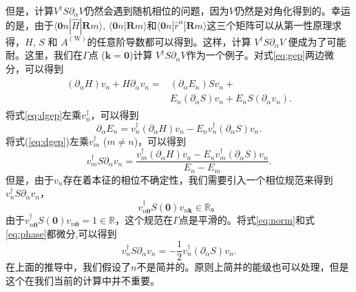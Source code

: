 但是，计算$V^{\dagger}S\partial_{\alpha}V$仍然会遇到随机相位的问题，因为$V$仍然是对角化得到的。幸运的是，由于$\langle\boldsymbol{0}n|\hat{H}|\boldsymbol{R}m\rangle$,
$\langle\boldsymbol{0}n|\boldsymbol{R}m\rangle$和$\langle\boldsymbol{0}n|\hat{r}^{\alpha}|\boldsymbol{R}m\rangle$这三个矩阵可以从第一性原理求得，$H$, $S$ 和 $A^{(\text{W})}$的任意阶导数都可以得到。这样，计算 $V^{\dagger}S\partial_{\alpha}V$ \cite{van2007computation}便成为了可能耐。这里，我们在$\Gamma$点 ($\boldsymbol{k}=\boldsymbol{0}$)计算
$V^{\dagger}S\partial_{\alpha}V$作为一个例子。对式\ref{eq:gep}两边微分，可以得到
\begin{align}
\begin{split}
(\partial_\alpha H)v_n+H\partial_\alpha v_n = & (\partial_\alpha E_n)Sv_n+\\
& E_n(\partial_\alpha S)v_n+E_n S(\partial_\alpha v_n).\label{eq:dgep}
\end{split}
\end{align}
将式\ref{eq:dgep}左乘$v_{n}^{\dagger}$，可以得到
\[
\partial_\alpha E_{n}=v_{n}^{\dagger}(\partial_\alpha H) v_{n}-E_{n}v_{n}^{\dagger}(\partial_\alpha S)v_{n}.
\]
将式(\ref{eq:dgep})左乘$v_{m}^{\dagger}$ ($m\ne n$)，可以得到
\[
v_{m}^{\dagger}S\partial_\alpha v_{n}=\frac{v_{m}^{\dagger}(\partial_\alpha H)v_{n}-E_{n}v_{m}^{\dagger}(\partial_\alpha S)v_{n}}{E_n-E_m}.
\]
但是，由于$v_{n}$存在着本征的相位不确定性，我们需要引入一个相位规范来得到$v_{n}^{\dagger}S \partial_\alpha v_{n}$，
\begin{equation}
v_{n\boldsymbol{0}}^{\dagger}S(\boldsymbol{0})v_{n\boldsymbol{k}}\in\mathbb{R}。\label{eq:phase}
\end{equation}
由于$v_{n\boldsymbol{0}}^{\dagger}S(\boldsymbol{0})v_{n\boldsymbol{0}}=1\in\mathbb{R}$，这个规范在$\Gamma$点是平滑的。将式\ref{eq:norm}和式\ref{eq:phase}都微分,可以得到
\[
v_{n}^{\dagger}S\partial_\alpha v_n=-\frac{1}{2}v_{n}^{\dagger}(\partial_\alpha S)v_n.
\]
在上面的推导中，我们假设了$n$不是简并的。原则上简并的能级也可以处理\cite{andrew1998computation}，但是这个在我们当前的计算中并不重要。
